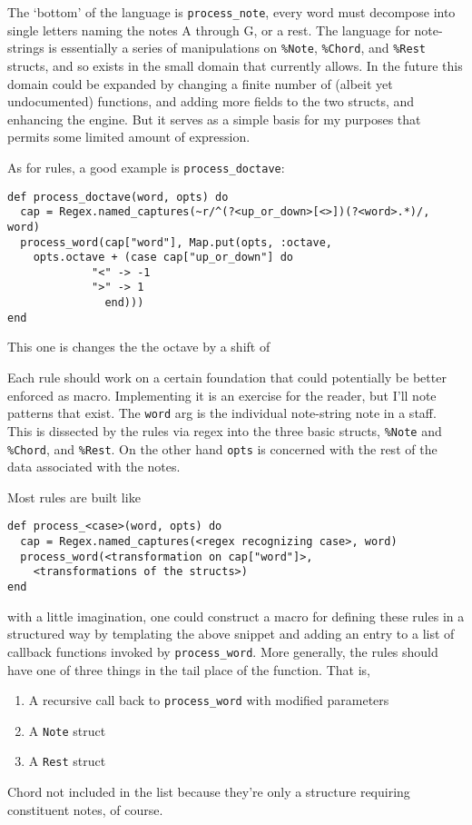 \documentclass[11pt]{article}
\begin{document}
The `bottom' of the language is \verb~process_note~, every word must
decompose into single letters naming the notes A through G, or a
rest. The language for note-strings is essentially a series of
manipulations on \verb~%Note~, \verb~%Chord~, and \verb~%Rest~ structs, and so exists in the
small domain that currently allows. In the future this domain could
be expanded by changing a finite number of (albeit yet
undocumented) functions, and adding more fields to the two structs,
and enhancing the engine. But it serves as a simple basis for my
purposes that permits some limited amount of expression.

As for rules, a good example is \verb~process_doctave~:
\begin{verbatim}
def process_doctave(word, opts) do
  cap = Regex.named_captures(~r/^(?<up_or_down>[<>])(?<word>.*)/, word)
  process_word(cap["word"], Map.put(opts, :octave,
	opts.octave + (case cap["up_or_down"] do
			 "<" -> -1
			 ">" -> 1
		       end)))
end
\end{verbatim}
This one is changes the the octave by a shift of

Each rule should work on a certain foundation that could
potentially be better enforced as macro. Implementing it is an
exercise for the reader, but I'll note patterns that exist. The
\verb~word~ arg is the individual note-string note in a staff. This is
dissected by the rules via regex into the three basic structs,
\verb~%Note~ and \verb~%Chord~, and \verb~%Rest~. On the other hand \verb~opts~ is
concerned with the rest of the data associated with the notes.

Most rules are built like
\begin{verbatim}
def process_<case>(word, opts) do
  cap = Regex.named_captures(<regex recognizing case>, word)
  process_word(<transformation on cap["word"]>,
    <transformations of the structs>)
end
\end{verbatim}
with a little imagination, one could construct a macro for defining
these rules in a structured way by templating the above snippet and
adding an entry to a list of callback functions invoked by
\verb~process_word~. More generally, the rules should have one of three
things in the tail place of the function. That is,
\begin{enumerate}
\item A recursive call back to \verb~process_word~ with modified parameters
\item A \verb~Note~ struct
\item A \verb~Rest~ struct
\end{enumerate}
Chord not included in the list because they're only a structure
requiring constituent notes, of course.
\end{document}
